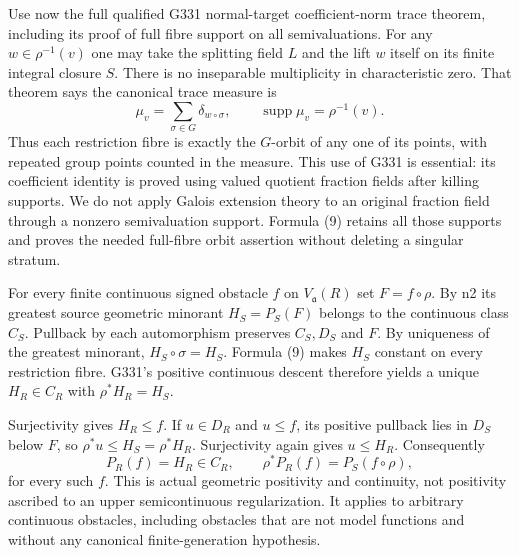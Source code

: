 Use now the full qualified G331 normal-target coefficient-norm trace theorem, including its proof of full fibre support on all semivaluations. For any $w\in\rho^{-1}(v)$ one may take the splitting field $L$ and the lift $w$ itself on its finite integral closure $S$. There is no inseparable multiplicity in characteristic zero. That theorem says the canonical trace measure is
\[
 \mu_v=\sum_{\sigma\in G}\delta_{w\circ\sigma},\qquad
 \operatorname{supp}\mu_v=\rho^{-1}(v). \tag{9}
\]
Thus each restriction fibre is exactly the $G$-orbit of any one of its points, with repeated group points counted in the measure. This use of G331 is essential: its coefficient identity is proved using valued quotient fraction fields after killing supports. We do not apply Galois extension theory to an original fraction field through a nonzero semivaluation support. Formula (9) retains all those supports and proves the needed full-fibre orbit assertion without deleting a singular stratum.

For every finite continuous signed obstacle $f$ on $V_{\mathfrak a}(R)$ set $F=f\circ\rho$. By n2 its greatest source geometric minorant $H_S=P_S(F)$ belongs to the continuous class $C_S$. Pullback by each automorphism preserves $C_S,D_S$ and $F$. By uniqueness of the greatest minorant, $H_S\circ\sigma=H_S$. Formula (9) makes $H_S$ constant on every restriction fibre. G331's positive continuous descent therefore yields a unique $H_R\in C_R$ with $\rho^*H_R=H_S$.

Surjectivity gives $H_R\le f$. If $u\in D_R$ and $u\le f$, its positive pullback lies in $D_S$ below $F$, so $\rho^*u\le H_S=\rho^*H_R$. Surjectivity again gives $u\le H_R$. Consequently
\[
 P_R(f)=H_R\in C_R,\qquad \rho^*P_R(f)=P_S(f\circ\rho), \tag{10}
\]
for every such $f$. This is actual geometric positivity and continuity, not positivity ascribed to an upper semicontinuous regularization. It applies to arbitrary continuous obstacles, including obstacles that are not model functions and without any canonical finite-generation hypothesis.

